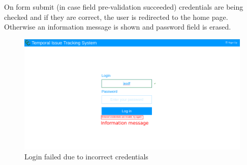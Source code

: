 \documentclass{article}
\begin{document}
On form submit (in case field pre-validation succeeded) credentials are being checked and if they are correct, the user is redirected to the home page. Otherwise an information message is shown and password field is erased.
\begin{figure}[H]
    \includegraphics[width=\textwidth]{img/loginfailed.png}
    \caption{Login failed due to incorrect credentials}
\end{figure}
\end{document}
